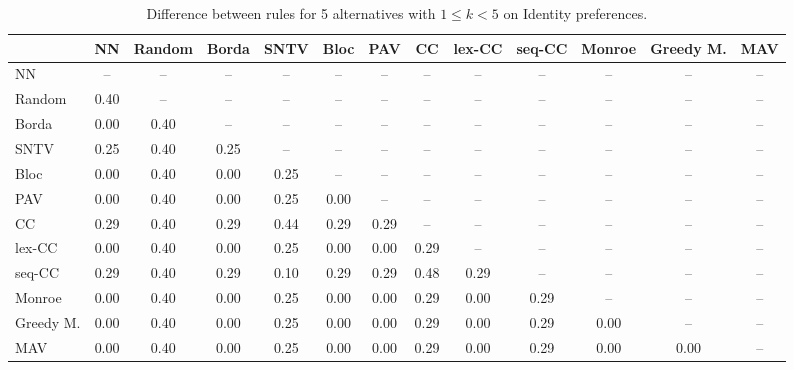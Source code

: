 
\begin{table*}[h!]
\centering
\begin{tabular}{lcccccccccccc}
\toprule
 & NN & Random & Borda & SNTV & Bloc & PAV & CC & lex-CC & seq-CC & Monroe & Greedy M. & MAV \\
\midrule
NN & -- & -- & -- & -- & -- & -- & -- & -- & -- & -- & -- & -- \\
Random & 0.40 & -- & -- & -- & -- & -- & -- & -- & -- & -- & -- & -- \\
Borda & 0.00 & 0.40 & -- & -- & -- & -- & -- & -- & -- & -- & -- & -- \\
SNTV & 0.25 & 0.40 & 0.25 & -- & -- & -- & -- & -- & -- & -- & -- & -- \\
Bloc & 0.00 & 0.40 & 0.00 & 0.25 & -- & -- & -- & -- & -- & -- & -- & -- \\
PAV & 0.00 & 0.40 & 0.00 & 0.25 & 0.00 & -- & -- & -- & -- & -- & -- & -- \\
CC & 0.29 & 0.40 & 0.29 & 0.44 & 0.29 & 0.29 & -- & -- & -- & -- & -- & -- \\
lex-CC & 0.00 & 0.40 & 0.00 & 0.25 & 0.00 & 0.00 & 0.29 & -- & -- & -- & -- & -- \\
seq-CC & 0.29 & 0.40 & 0.29 & 0.10 & 0.29 & 0.29 & 0.48 & 0.29 & -- & -- & -- & -- \\
Monroe & 0.00 & 0.40 & 0.00 & 0.25 & 0.00 & 0.00 & 0.29 & 0.00 & 0.29 & -- & -- & -- \\
Greedy M. & 0.00 & 0.40 & 0.00 & 0.25 & 0.00 & 0.00 & 0.29 & 0.00 & 0.29 & 0.00 & -- & -- \\
MAV & 0.00 & 0.40 & 0.00 & 0.25 & 0.00 & 0.00 & 0.29 & 0.00 & 0.29 & 0.00 & 0.00 & -- \\
\bottomrule
\end{tabular}

\caption{Difference between rules for 5 alternatives with $1 \leq k < 5$ on Identity preferences.}
\end{table*}
